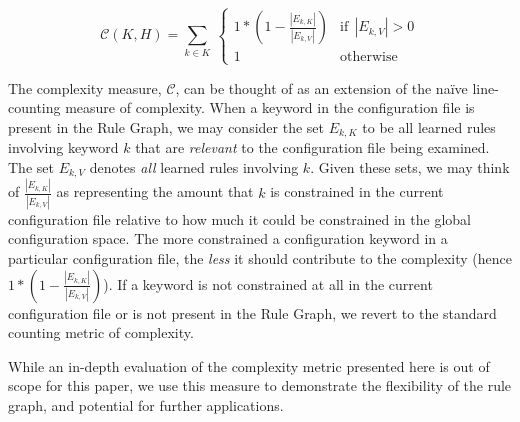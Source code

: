 \begin{equation}
    \mathcal{C}(K, H) = \sum_{k \in K} \
        \begin{cases}
            1 * (1 - \frac{|E_{k, K}|}{|E_{k, V}|}) & \text{if}\ \ |E_{k, V}| > 0 \\
            1 & \text{otherwise}
        \end{cases}
\end{equation}

The complexity measure, $\mathcal{C}$, can be thought of as an
extension of the na\"ive line-counting measure of complexity.
When a keyword in the configuration file is present in the Rule Graph,
we may consider the set $E_{k, K}$ to be all learned rules involving
keyword $k$ that
are {\it relevant} to the configuration file being examined. 
The set $E_{k, V}$ denotes {\it all} learned rules involving $k$.
Given these sets, we may think of $\frac{|E_{k, K}|}{|E_{k, V}|}$
as representing the amount that $k$ is constrained in the current
configuration file relative to how much it could be constrained
in the global configuration space. The more constrained a configuration
keyword in a particular configuration file, the {\it less} it should
contribute to the complexity (hence $1 * (1 - \frac{|E_{k, K}|}{|E_{k, V}|})$).
If a keyword is not constrained at all in the current configuration
file or is not present in the Rule Graph, we revert to the standard
counting metric of complexity. 

While an in-depth evaluation of the complexity metric presented here
is out of scope for this paper, we use this measure to
demonstrate the flexibility of the rule graph, and potential
for further applications.


